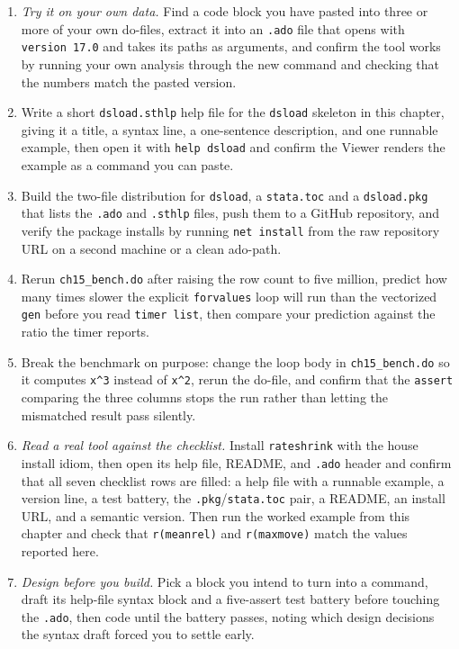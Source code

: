 \documentclass[
    a4paper,
    fontsize=10pt,
    twoside=true,
    numbers=noenddot,
]{kaobook}
\begin{document}
\begin{enumerate}
    \item \emph{Try it on your own data.} Find a code block you have pasted into three or more of your own do-files, extract it into an \texttt{.ado} file that opens with \texttt{version 17.0} and takes its paths as arguments, and confirm the tool works by running your own analysis through the new command and checking that the numbers match the pasted version.
    \item Write a short \texttt{dsload.sthlp} help file for the \texttt{dsload} skeleton in this chapter, giving it a title, a syntax line, a one-sentence description, and one runnable example, then open it with \texttt{help dsload} and confirm the Viewer renders the example as a command you can paste.
    \item Build the two-file distribution for \texttt{dsload}, a \texttt{stata.toc} and a \texttt{dsload.pkg} that lists the \texttt{.ado} and \texttt{.sthlp} files, push them to a GitHub repository, and verify the package installs by running \texttt{net install} from the raw repository URL on a second machine or a clean ado-path.
    \item Rerun \texttt{ch15\_bench.do} after raising the row count to five million, predict how many times slower the explicit \texttt{forvalues} loop will run than the vectorized \texttt{gen} before you read \texttt{timer list}, then compare your prediction against the ratio the timer reports.
    \item Break the benchmark on purpose: change the loop body in \texttt{ch15\_bench.do} so it computes \texttt{x\textasciicircum 3} instead of \texttt{x\textasciicircum 2}, rerun the do-file, and confirm that the \texttt{assert} comparing the three columns stops the run rather than letting the mismatched result pass silently.
    \item \emph{Read a real tool against the checklist.} Install \texttt{rateshrink} with the house install idiom, then open its help file, README, and \texttt{.ado} header and confirm that all seven checklist rows are filled: a help file with a runnable example, a version line, a test battery, the \texttt{.pkg}/\texttt{stata.toc} pair, a README, an install URL, and a semantic version. Then run the worked example from this chapter and check that \texttt{r(meanrel)} and \texttt{r(maxmove)} match the values reported here.
    \item \emph{Design before you build.} Pick a block you intend to turn into a command, draft its help-file syntax block and a five-assert test battery before touching the \texttt{.ado}, then code until the battery passes, noting which design decisions the syntax draft forced you to settle early.
\end{enumerate}
\end{document}
